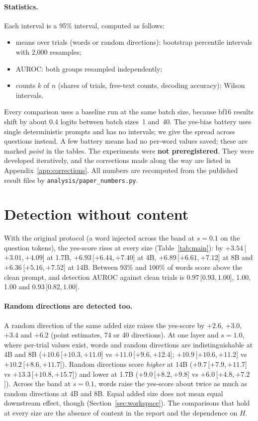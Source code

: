 \documentclass[11pt]{article}
\newcommand{\ci}[3]{\ensuremath{#1}\,[\ensuremath{#2},\allowbreak\,\ensuremath{#3}]}
\newcommand{\ys}{yes-score}
\begin{document}
\paragraph{Statistics.} Each interval is a 95\% interval, computed as follows:
\begin{itemize}
  \item means over trials (words or random directions): bootstrap percentile intervals with 2,000 resamples;
  \item AUROC: both groups resampled independently;
  \item counts $k$ of $n$ (shares of trials, free-text counts, decoding accuracy): Wilson intervals.
\end{itemize}
Every comparison uses a baseline run at the same batch size, because bf16 results shift by about 0.4 logits between batch sizes~1 and~40. The yes-bias battery uses single deterministic prompts and has no intervals; we give the spread across questions instead. A few battery means had no per-word values saved; these are marked \emph{point} in the tables. The experiments were \textbf{not preregistered}. They were developed iteratively, and the corrections made along the way are listed in Appendix~\ref{app:corrections}. All numbers are recomputed from the published result files by \texttt{analysis/paper\_numbers.py}.

\section{Detection without content}\label{sec:detect}

With the original protocol (a word injected across the band at $s=0.1$ on the question tokens), the \ys{} rises at every size (Table~\ref{tab:main}): by \ci{+3.54}{+3.01}{+4.09} at 1.7B, \ci{+6.93}{+6.44}{+7.40} at 4B, \ci{+6.89}{+6.61}{+7.12} at 8B and \ci{+6.36}{+5.16}{+7.52} at 14B. Between 93\% and 100\% of words score above the clean prompt, and detection AUROC against clean trials is \ci{0.97}{0.93}{1.00}, 1.00, 1.00 and \ci{0.93}{0.82}{1.00}.

\paragraph{Random directions are detected too.} A random direction of the same added size raises the \ys{} by $+2.6$, $+3.0$, $+3.4$ and $+6.2$ (point estimates, 74 or 40 directions). At one layer and $s=1.0$, where per-trial values exist, words and random directions are indistinguishable at 4B and 8B (\ci{+10.6}{+10.3}{+11.0} vs \ci{+11.0}{+9.6}{+12.4}; \ci{+10.9}{+10.6}{+11.2} vs \ci{+10.2}{+8.6}{+11.7}). Random directions score \emph{higher} at 14B (\ci{+9.7}{+7.9}{+11.7} vs \ci{+13.3}{+10.8}{+15.7}) and lower at 1.7B (\ci{+9.0}{+8.2}{+9.8} vs \ci{+6.0}{+4.8}{+7.2}). Across the band at $s=0.1$, words raise the \ys{} about twice as much as random directions at 4B and 8B. Equal added size does not mean equal downstream effect, though (Section~\ref{sec:workspace}). The comparisons that hold at every size are the absence of content in the report and the dependence on $H$.
\end{document}
